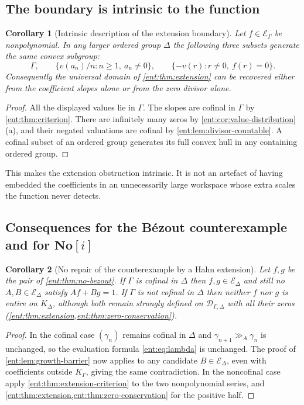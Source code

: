 \documentclass[11pt]{article}
\theoremstyle{plain}
\theoremstyle{plain}
\theoremstyle{plain}
\newtheorem{corollary}[corollary]{Corollary}
\theoremstyle{definition}
\theoremstyle{definition}
\theoremstyle{definition}
\theoremstyle{definition}
\theoremstyle{remark}
\newcommand{\No}{\mathbf{No}}
\newcommand{\K}{K_\Gamma}\newcommand{\KD}{K_\Delta}
\newcommand{\E}{\mathcal E_\Gamma}
\newcommand{\ggA}{\mathrel{\gg_{\!A}}}
\begin{document}
\subsection{The boundary is intrinsic to the function}
\begin{corollary}[Intrinsic description of the extension boundary]
\label{ent:cor:intrinsic-boundary}
Let $f\in\E$ be nonpolynomial. In any larger ordered group $\Delta$ the
following three subsets generate the same convex subgroup:
\[
 \Gamma,\qquad
 \{v(a_n)/n:n\ge1,\ a_n\ne0\},\qquad
 \{-v(r):r\ne0,\ f(r)=0\}.
\]
Consequently the universal domain of \cref{ent:thm:extension} can be
recovered either from the coefficient slopes alone or from the zero divisor
alone.
\end{corollary}
\begin{proof}
All the displayed values lie in $\Gamma$. The slopes are cofinal in $\Gamma$
by \cref{ent:thm:criterion}. There are infinitely many zeros by
\cref{ent:cor:value-distribution}(a), and their negated valuations are
cofinal by \cref{ent:lem:divisor-countable}. A cofinal subset of an ordered
group generates its full convex hull in any containing ordered group.
\end{proof}

This makes the extension obstruction intrinsic. It is not an artefact of
having embedded the coefficients in an unnecessarily large workspace whose
extra scales the function never detects.

\subsection{Consequences for the B\'ezout counterexample and for \texorpdfstring{$\No[i]$}{No[i]}}
\begin{corollary}[No repair of the counterexample by a Hahn extension]
\label{ent:cor:no-repair}
Let $f,g$ be the pair of \cref{ent:thm:no-bezout}. If $\Gamma$ is cofinal in
$\Delta$ then $f,g\in\mathcal E_\Delta$ and still no
$A,B\in\mathcal E_\Delta$ satisfy $Af+Bg=1$. If $\Gamma$ is not cofinal in
$\Delta$ then neither $f$ nor $g$ is entire on $\KD$, although both remain
strongly defined on $\mathcal D_{\Gamma,\Delta}$ with all their zeros
(\cref{ent:thm:extension,ent:thm:zero-conservation}).
\end{corollary}
\begin{proof}
In the cofinal case $(\gamma_n)$ remains cofinal in $\Delta$ and
$\gamma_{n+1}\ggA\gamma_n$ is unchanged, so the evaluation formula
\eqref{ent:eq:lambda} is unchanged. The proof of
\cref{ent:lem:growth-barrier} now applies to any candidate
$B\in\mathcal E_\Delta$, even with coefficients outside $\K$, giving the same
contradiction. In the noncofinal case apply
\cref{ent:thm:extension-criterion} to the two nonpolynomial series, and
\cref{ent:thm:extension,ent:thm:zero-conservation} for the positive half.
\end{proof}
\end{document}
